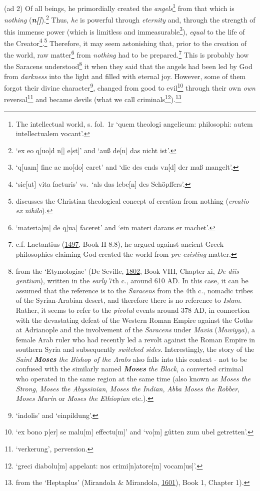 \documentclass[
]{article}
\begin{document}
(ad 2) Of all beings, he primordially created the
\emph{angels}\footnote{The intellectual world, s. fol.~1r `quem theologi
  angelicum: philosophi: autem intellectualem vocant'.} from that which
is \emph{nothing} (\textbf{\emph{n{[}{]}}}).\footnote{`ex eo q{[}uo{]}d
  n{[}{]} e{[}st{]}' and `auß de{[}n{]} das nicht ist'.} Thus, \emph{he}
is powerful through \emph{eternity} and, through the strength of this
immense power (which is limitless and immeasurable\footnote{`q{[}uam{]}
  fine ac mo{[}do{]} caret' and `die des ends vn{[}d{]} der maß
  mangelt'.}), \emph{equal} to the life of the
Creator\footnote{`sic{[}ut{]} vita facturis' vs.~`als das lebe{[}n{]}
  des Schöpffers'.}.\footnote{discusses the Christian theological
  concept of creation from nothing (\emph{creatio ex nihilo}).}
Therefore, it may seem astonishing that, prior to the creation of the
world, raw matter\footnote{`materia{[}m{]} de q{[}ua{]} faceret' and
  `ein materi daraus er machet'.} from \emph{nothing} had to be
prepared.\footnote{c.f. Lactantius
  (\href{https://books.google.com/books?id=qGsnghsi3uUC}{1497}, Book II
  8.8), he argued against ancient Greek philosophies claiming God
  created the world from \emph{pre-existing} matter.} This is probably
how the Saracens understood\footnote{from the `Etymologiae' (De Seville,
  \href{https://books.google.com/books?id=wb8Z_vlSyJwC}{1802}, Book
  VIII, Chapter xi, \emph{De diis gentium}), written in the \emph{early}
  7th c., around 610 AD. In this case, it can be assumed that the
  reference is to the \emph{Saracens} from the 4th c., nomadic tribes of
  the Syrian-Arabian desert, and therefore there is no reference to
  \emph{Islam}. Rather, it seems to refer to the \emph{pivotal} events
  around 378 AD, in connection with the devastating defeat of the
  Western Roman Empire against the Goths at Adrianople and the
  involvement of the \emph{Saracens} under \emph{Mavia}
  (\emph{Mawiyya}), a female Arab ruler who had recently led a revolt
  against the Roman Empire in southern Syria and subsequently
  \emph{switched sides}. Interestingly, the story of the \emph{Saint}
  \textbf{\emph{Moses}} \emph{the Bishop of the Arabs} also falls into
  this context - not to be confused with the similarly named
  \textbf{\emph{Moses}} \emph{the Black}, a converted criminal who
  operated in the same region at the same time (also known as
  \emph{Moses the Strong}, \emph{Moses the Abyssinian}, \emph{Moses the
  Indian}, \emph{Abba Moses the Robber}, \emph{Moses Murin} or
  \emph{Moses the Ethiopian} etc.).} it when they said that the angels
had been led by God from \emph{darkness} into the light and filled with
eternal joy. However, some of them forgot their divine
character\footnote{`indolis' and `einpildung'.}, changed from good to
evil\footnote{`ex bono p{[}er{]} se malu{[}m{]} effectu{[}m{]}' and
  `vo{[}m{]} gůtten zum ubel getretten'.} through their own \emph{own}
reversal\footnote{`verkerung', perversion.} and became devils (what we
call criminals\footnote{`greci diabolu{[}m{]} appelant: nos
  crimi{[}n{]}atore{[}m{]} vocam{[}us{]}'.}).\footnote{from the
  `Heptaplus' (Mirandola \& Mirandola,
  \href{https://doi.org/10.3931/e-rara-61217}{1601}), Book 1, Chapter
  1).}
\end{document}

